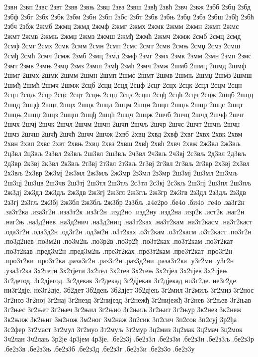 {2звн
2звп
2звс
2звт
2звв
2звњ
2звџ
2звз
2звш
2звђ
2звћ
2звч
2звж
2збб
2збц
2збд
2збф
2збг
2збх
2збк
2збм
2збн
2збп
2збс
2збт
2збв
2збњ
2збџ
2збз
2збш
2збђ
2збћ
2збч
2збж
2жмб
2жмц
2жмд
2жмф
2жмг
2жмх
2жмк
2жмм
2жмн
2жмп
2жмс
2жмт
2жмв
2жмњ
2жмџ
2жмз
2жмш
2жмђ
2жмћ
2жмч
2жмж
2смб
2смц
2смд
2смф
2смг
2смх
2смк
2смм
2смн
2смп
2смс
2смт
2смв
2смњ
2смџ
2смз
2смш
2смђ
2смћ
2смч
2смж
2змб
2змц
2змд
2змф
2змг
2змх
2змк
2змм
2змн
2змп
2змс
2змт
2змв
2змњ
2змџ
2змз
2змш
2змђ
2змћ
2змч
2змж
2шмб
2шмц
2шмд
2шмф
2шмг
2шмх
2шмк
2шмм
2шмн
2шмп
2шмс
2шмт
2шмв
2шмњ
2шмџ
2шмз
2шмш
2шмђ
2шмћ
2шмч
2шмж
2сцб
2сцц
2сцд
2сцф
2сцг
2сцх
2сцк
2сцл
2сцм
2сцн
2сцп
2сцљ
2сцр
2сцс
2сцт
2сцњ
2сцџ
2сцз
2сцш
2сцђ
2сцћ
2сцч
2сцж
2шцб
2шцц
2шцд
2шцф
2шцг
2шцх
2шцк
2шцл
2шцм
2шцн
2шцп
2шцљ
2шцр
2шцс
2шцт
2шцњ
2шцџ
2шцз
2шцш
2шцђ
2шцћ
2шцч
2шцж
2шчб
2шчц
2шчд
2шчф
2шчг
2шчх
2шчј
2шчк
2шчл
2шчм
2шчн
2шчп
2шчљ
2шчр
2шчс
2шчт
2шчњ
2шчџ
2шчз
2шчш
2шчђ
2шчћ
2шчч
2шчж
2хвб
2хвц
2хвд
2хвф
2хвг
2хвх
2хвк
2хвм
2хвн
2хвп
2хвс
2хвт
2хвњ
2хвџ
2хвз
2хвш
2хвђ
2хвћ
2хвч
2хвж
2ж3вл
2ж3вљ
2ц3вл
2ц3вљ
2з3вл
2з3вљ
2ш3вл
2ш3вљ
2ч3вл
2ч3вљ
2ч3вј
2с3вљ
2д3вл
2д3вљ
2д3вр
2к3вј
2к3вл
2к3вљ
2т3вј
2т3вл
2т3вљ
2г3вј
2г3вл
2г3вљ
2г3вр
2х3вј
2х3вл
2х3вљ
2х3вр
2ж3мј
2ж3мл
2ж3мљ
2ж3мр
2з3мл
2з3мр
2ш3мј
2ш3мл
2ш3мљ
2ш3цј
2ш3цв
2ш3чв
2ш3тј
2ш3тл
2ш3тљ
2с3тл
2с3кј
2с3кљ
2ш3пј
2ш3пл
2ш3пљ
2ж3дј
2ж3дл
2ж3дљ
2ж3дв
2ж3гј
2ж3гл
2ж3гљ
2ж3гр
2ж3гв
2з3дл
2з3дљ
2з3дв
2з3гј
2з3гљ
2ж3бј
2ж3бл
2ж3бљ
2ж3бр
2з3бљ
.а4е2ро
.бе4о
.би4о
.ге4о
.за3г2н
.за3т2ка
.иза3г2н
.иза3т2к
.из3г2н
.изд2но
.изд2ну
.изд2на
.изр2к
.ист2к
.наг2н
.наг2њ
.на3д2нев
.на3д2нич
.на3д2ниц
.на3т2ках
.на3т2кам
.на3т2касм
.на3т2каст
.ода3г2н
.ода3д2н
.од3г2н
.од3м2н
.о3т2ках
.о3т2кам
.о3т2касм
.о3т2каст
.по3г2н
.по3д2нев
.по3м2н
.по3м2њ
.по3р2в
.по3р2ђ
.по3т2ках
.по3т2кам
.по3т2кат
.по3т2кав
.пред3м2н
.пред3м2њ
.пре3т2ках
.пре3т2кам
.пре3т2кат
.про3г2н
.про3т2ки
.про3т2ка
.раза3г2н
.раз3г2н
.раз3д2ни
.раза3т2ка
.у3г2ми
.у3г2н
.уза3т2ка
3х2тети
3х2тјети
3х2тел
3х2тев
3х2тењ
3х2тјел
3х2тјев
3х2тјењ
3г2дегод.
3г2дјегод.
3г2декак
3г2декад
3г2дјекак
3г2дјекад
ни3г2де.
не3г2де.
ни3г2дје.
не3г2дје.
3б2дет
3б2дењ
3б2дјет
3б2дјењ
3г2мил
3г2миљ
3г2миз
3г2нос
3г2ноз
3г2ној
3г2нај
3г2незд
3г2нијезд
3г2нежђ
3г2нијежђ
3г2нев
3г2њев
3г2њав
3г2њес
3г2њет
3г2њеч
3г2њил
3г2њио
3г2њиљ
3г2њит
3г2њур
3к2нез
3к2неж
3к2њиж
3к2њиг
3м2нож
3м2ног
3м2наж
3п2сик
3п2сич
3п2сов
3п2суј
3р2ђа
3с2фер
3т2маст
3т2мул
3т2муо
3т2муљ
3т2мур
3ц2миз
3ц2мак
3ц2мач
3ц2мок
3ч2лан
3ч2лањ
3р2је
4р3јем
4р3је.
.бе2з3ј
.бе2з3л
.бе2з3м
.бе2з3н
.бе2з3љ
.бе2з3р
.бе2з3в
.бе2з3њ
.бе2з3б
.бе2з3д
.бе2з3г
.бе2з3и
.бе2з3о
.бе2з3у
}
